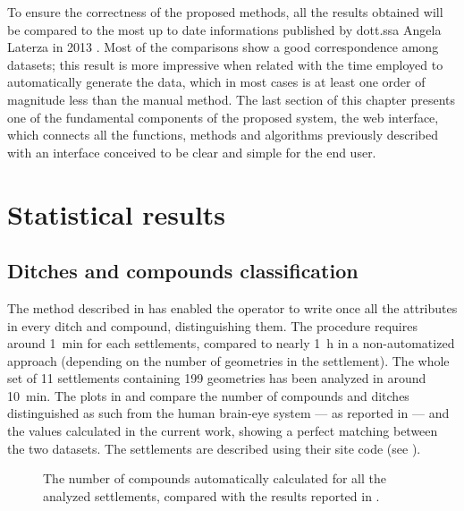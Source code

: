     To ensure the correctness of the proposed methods, all the results obtained will be compared to the most up to date informations published by dott.ssa Angela Laterza in 2013 \cite{laterza}. Most of the comparisons show a good correspondence among datasets; this result is more impressive when related with the time employed to automatically generate the data, which in most cases is at least one order of magnitude less than the manual method. The last section of this chapter presents one of the fundamental components of the proposed system, the web interface, which connects all the functions, methods and algorithms previously described with an interface conceived to be clear and simple for the end user.

    \section{Statistical results}
        \subsection{Ditches and compounds classification}
            The method described in  has enabled the operator to write once all the attributes in every ditch and compound, distinguishing them. The procedure requires around \SI{1}{\minute} for each settlements, compared to nearly \SI{1}{\hour} in a non-automatized approach (depending on the number of geometries in the settlement). The whole set of 11 settlements containing 199 geometries has been analyzed in around \SI{10}{\minute}. The plots in  and  compare the number of compounds and ditches distinguished as such from the human brain-eye system --- as reported in \cite{laterza} --- and the values calculated in the current work, showing a perfect matching between the two datasets. The settlements are described using their site code (see ).

            \begin{figure}[H]
                \centering
                \begin{tikzpicture}
                    
                \end{tikzpicture}
                \caption[The number of compounds in \cite{laterza} compared to the results of the proposed method.]{The number of compounds automatically calculated for all the analyzed settlements, compared with the results reported in \cite{laterza}.}
                \label{fig:graph-num-compound}
            \end{figure}


